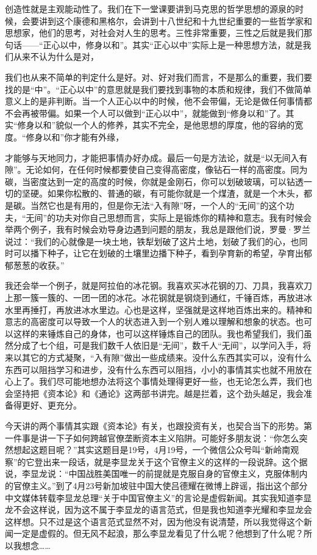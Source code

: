 \documentclass[UTF8, 12pt, a4paper]{ctexrep}
\begin{document}
创造性就是主观能动性了。我们在下一堂课要讲到马克思的哲学思想的源泉的时候，会要讲到这个康德和黑格尔，会讲到十八世纪和十九世纪重要的一些哲学家和思想家，他们的思考，对社会对人生的思考。三性非常重要，三性之后就是我们那句话——“正心以中，修身以和”。其实“正心以中”实际上是一种思想方法，就是我们从来不认为什么是对，

我们也从来不简单的判定什么是好。对、好对我们而言，不是那么的重要，我们要找的是“中”。“正心以中”的意思就是我们要找到事物的本质和规律，我们不做简单意义上的是非判断。当一个人正心以中的时候，他不会带偏，无论是做任何事情都不会再被带偏。如果一个人可以做到“正心以中”，就能做到“修身以和”了。其实“修身以和”貌似一个人的修养，其实不完全，是他思想的厚度，他的容纳的宽度。“修身以和”你才能有外缘，

才能够与天地同力，才能把事情办好办成。最后一句是方法论，就是“以无间入有隙”。无论如何，在任何时候都要使自己变得高密度，像钻石一样的高密度。同为碳，当密度达到一定的高度的时候，你就是金刚石，你可以划破玻璃，可以钻透一切的坚硬。如果你松散的、普通的碳，有可能你就是一个煤渣，就是一个木头，都是碳。当然它也是有用的，但是你无法“入有隙”呀，一个人的“无间”的这个功夫，“无间”的功夫对你自己思想而言，实际上是锻炼你的精神和意志。我有时候会举两个例子，我有时候会劝导身边遇到问题的朋友，我总是跟他们说，罗曼·罗兰说过：“我们的心就像是一块土地，铁犁划破了这片土地，划破了我们的心，也同时可以播下种子，让它在划破的土壤里边播下种子，看到孕育新的希望，孕育出郁郁葱葱的收获。”

我还会举一个例子，就是阿拉伯的冰花钢。我喜欢买冰花钢的刀、刀具，我喜欢刀上那一簇一簇的、一团一团的冰花。冰花钢就是钢烧到通红，千锤百炼，再放进冰水里再捶打，再放进冰水里边。心也是这样，坚强就是这样地百炼出来的。精神和意志的高密度可以导致一个人的状态进入到一个别人难以理解和想象的状态。也可以这样的来锤炼自己的身体，也可以这样锤炼自己的团队。我也希望我们，我们虽然分成了七个组，可是我们数千人依旧是“无间”，数千人“无间”，以学问入手，将来以其它的方式凝聚，“入有隙”做出一些成绩来。没什么东西其实可以，没有什么东西可以阻挡学习和进步，没有什么东西可以阻挡，小小的事情其实也就不用放在心上了。我们尽可能地想办法将这个事情处理得更好一些，也无论怎么弄，我们也会坚持把《资本论》和《通论》这两部书讲完。越是拦着，这个劲头越足，我会准备得更好、更充分。

今天讲的两个事情其实跟《资本论》有关，也跟投资有关，也契合当下的形势。第一件事是讲一下子如何跨越官僚垄断资本主义陷阱。可能好多朋友说：“你怎么突然想起这题目呢？”其实这题目是19号，4月19号，一个微信公众号叫“新岭南观察”的它登出来一段话，就是李显龙关于这个官僚主义的这样的一段说辞。这个据说，李显龙说：“中国战胜美国唯一的前提就是克服自身的官僚主义，克服体制内的官僚主义。”到了4月23号新加坡驻中国大使吕德耀在微博上辟谣，指出这个部分中文媒体转载李显龙总理“关于中国官僚主义”的言论是虚假新闻。其实我知道李显龙不会这样说，因为这不属于李显龙的语言范式，但是我也知道李光耀和李显龙会这样想。只不过是这个语言范式显然不对，因为他没有说清楚，所以我觉得这个新闻一定是虚假的。但无风不起浪，那么李显龙看见了什么呢？他想到了什么呢？所以我想念……
\end{document}
